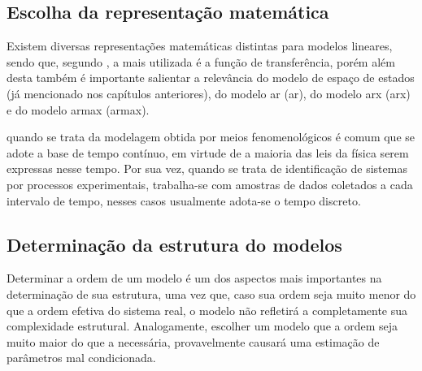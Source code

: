 \subsection{Escolha da representação matemática}
\label{subsec:escolha_da_representacao_matematica}

Existem diversas representações matemáticas distintas para modelos lineares, sendo que, segundo
, a mais utilizada é a função de transferência, porém além desta também
é importante salientar a relevância do modelo de espaço de estados (já mencionado nos capítulos
anteriores), do modelo \acrshort{ar} (\acrlong{ar}), do modelo \acrshort{arx} (\acrlong{arx}) e
do modelo \acrshort{armax} (\acrlong{armax}).

\begin{citacao}
    \text{[...]} quando se trata da modelagem obtida por meios fenomenológicos é comum que se adote a base de
    tempo contínuo, em virtude de a maioria das leis da física serem expressas nesse tempo. Por sua vez,
    quando se trata de identificação de sistemas por processos experimentais, trabalha-se com amostras
    de dados coletados a cada intervalo de tempo, nesses casos usualmente adota-se o tempo discreto.
\end{citacao}

\subsection{Determinação da estrutura do modelos}
\label{subsec:determinacao_da_estrutura_do_modelo}

Determinar a ordem de um modelo é um dos aspectos mais importantes na determinação de sua estrutura,
uma vez que, caso sua ordem seja muito menor do que a ordem efetiva do sistema real, o modelo não
refletirá a completamente sua complexidade estrutural. Analogamente, escolher um modelo que a ordem
seja muito maior do que a necessária, provavelmente causará uma estimação de parâmetros mal condicionada.
\cite{Aguirre2015}

